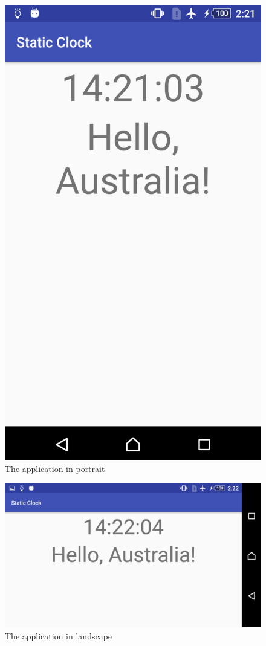 \documentclass{scrartcl}
\begin{document}
\begin{figure}[h]
    \centering
    \includegraphics[scale=0.1]{images/portrait.png}
    \caption{The application in portrait}
\end{figure}
\begin{figure}[h]
    \centering
    \includegraphics[scale=0.1]{images/landscape.png}
    \caption{The application in landscape}
\end{figure}
\end{document}

